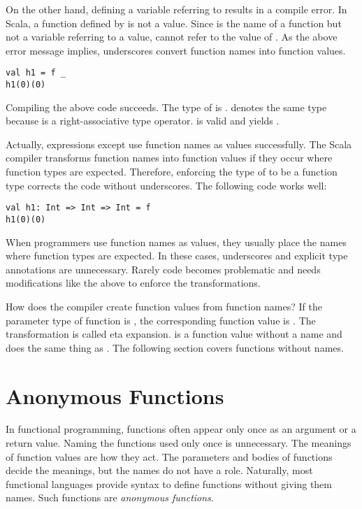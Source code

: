 On the other hand, defining a variable referring to  results in a compile
error. In Scala, a function defined by  is not a value. Since 
is the name of a function but not a variable referring to a value, 
cannot refer to the value of . As the above error message implies,
underscores convert function names into function values.

\begin{verbatim}
val h1 = f _
h1(0)(0)
\end{verbatim}

Compiling the above code succeeds. The type of  is .
 denotes the same type because \code{=>} is
a right-associative type operator.  is valid and yields .

Actually, expressions except  use function names as values
successfully. The Scala compiler transforms function names into function values if
they occur where function types are expected. Therefore, enforcing the type of
 to be a function type corrects the code without underscores. The
following code works well:

\begin{verbatim}
val h1: Int => Int => Int = f
h1(0)(0)
\end{verbatim}

When programmers use function names as values, they usually place the names where
function types are expected. In these cases, underscores and explicit type
annotations are unnecessary. Rarely code becomes problematic and needs
modifications like the above to enforce the transformations.

How does the compiler create function values from function names? If the parameter
type of function  is , the corresponding function value is
. The transformation is called eta expansion. 
is a function value without a name and does the same thing as
. The following section covers functions without names.

\section{Anonymous Functions}

In functional programming, functions often appear only once as an argument or a
return value. Naming the functions used only once is unnecessary. The meanings of
function values are how they act. The parameters and bodies of functions decide
the meanings, but the names do not have a role. Naturally, most functional
languages provide syntax to define functions without giving them names. Such
functions are \textit{anonymous functions}.

